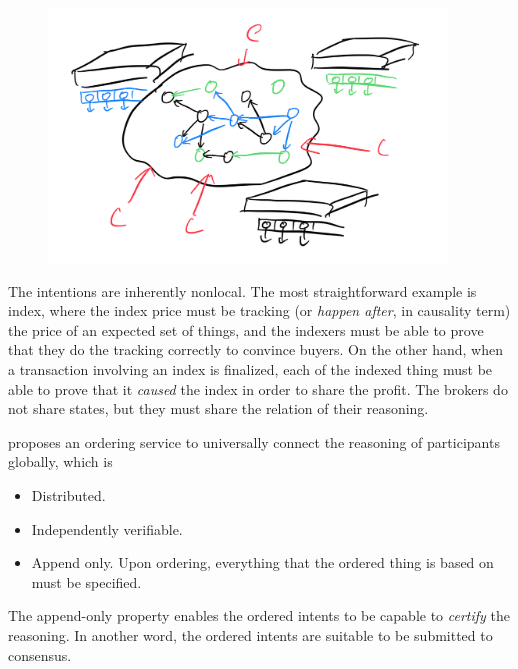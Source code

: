 \begin{figure}[H]
    \includegraphics[width=300pt]{graphs/IMG_0058}
    \Description{}
\end{figure}

The intentions are inherently nonlocal.
The most straightforward example is index, where the index price must be tracking (or \emph{happen after}, in causality term) the price of an expected set of things, and the indexers must be able to prove that they do the tracking correctly to convince buyers.
On the other hand, when a transaction involving an index is finalized, each of the indexed thing must be able to prove that it \emph{caused} the index in order to share the profit.
The brokers do not share states, but they must share the relation of their reasoning.

\sys proposes an ordering service to universally connect the reasoning of participants globally, which is
\begin{itemize}
    \item Distributed. 
    \item Independently verifiable.
    \item Append only.
    Upon ordering, everything that the ordered thing is based on must be specified.
\end{itemize}

The append-only property enables the ordered intents to be capable to \emph{certify} the reasoning.
In another word, the ordered intents are suitable to be submitted to consensus.

